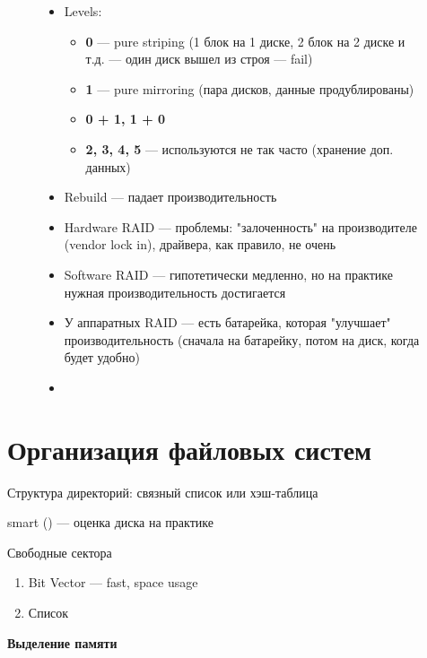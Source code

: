 \documentclass[../../lectures.tex]{subfiles}
\begin{document}
\begin{figure}[H]
\begin{minipage}[c]{0.55\linewidth}
\begin{itemize}
    \item Levels:
        \begin{itemize}
            \item \textbf{0} --- pure striping (1 блок на 1 диске, 2 блок на 2 диске и т.д. --- один диск вышел из строя --- fail)
            \item \textbf{1} --- pure mirroring (пара дисков, данные продублированы)
            \item \textbf{0 + 1, 1 + 0}
            \item \textbf{2, 3, 4, 5} --- используются не так часто (хранение доп. данных)
        \end{itemize}
    \item Rebuild --- падает производительность
    \item Hardware RAID --- проблемы: "залоченность" на производителе (vendor lock in), драйвера, как правило, не очень
    \item Software RAID --- гипотетически медленно, но на практике нужная производительность достигается
    \item У аппаратных RAID --- есть батарейка, которая "улучшает" производительность 
          (сначала на батарейку, потом на диск, когда будет удобно)
    \item {}
\end{itemize}
\end{minipage}
\end{figure}

\newpage
\section{Организация файловых систем}
Структура директорий: связный список или хэш-таблица

smart () --- оценка диска на практике

Свободные сектора
\begin{enumerate}
    \item Bit Vector --- fast, space usage
    \item Список
\end{enumerate}

\begin{center}\textbf{Выделение памяти}\end{center}
\end{document}
